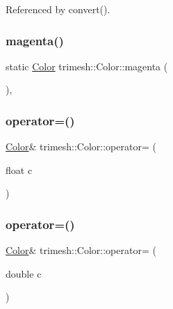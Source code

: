 Referenced by convert().

\mbox{\label{classtrimesh_1_1Color_af9fb47c4be66c136c0acce1df09c5b90}} 
\subsubsection{\texorpdfstring{magenta()}{magenta()}}
{\footnotesize\ttfamily static \hyperlink{classtrimesh_1_1Color}{Color} trimesh\+::\+Color\+::magenta (\begin{DoxyParamCaption}{ }\end{DoxyParamCaption})\hspace{0.3cm}{\ttfamily [inline]}, {\ttfamily [static]}}

\mbox{\label{classtrimesh_1_1Color_a5db3d69c50675fead68e02b92247a410}} 
\subsubsection{\texorpdfstring{operator=()}{operator=()}\hspace{0.1cm}{\footnotesize\ttfamily [1/3]}}
{\footnotesize\ttfamily \hyperlink{classtrimesh_1_1Color}{Color}\& trimesh\+::\+Color\+::operator= (\begin{DoxyParamCaption}\item[{float}]{c }\end{DoxyParamCaption})\hspace{0.3cm}{\ttfamily [inline]}}

\mbox{\label{classtrimesh_1_1Color_a3af13e0b2b3b1e778ac35d9063adc3a5}} 
\subsubsection{\texorpdfstring{operator=()}{operator=()}\hspace{0.1cm}{\footnotesize\ttfamily [2/3]}}
{\footnotesize\ttfamily \hyperlink{classtrimesh_1_1Color}{Color}\& trimesh\+::\+Color\+::operator= (\begin{DoxyParamCaption}\item[{double}]{c }\end{DoxyParamCaption})\hspace{0.3cm}{\ttfamily [inline]}}

